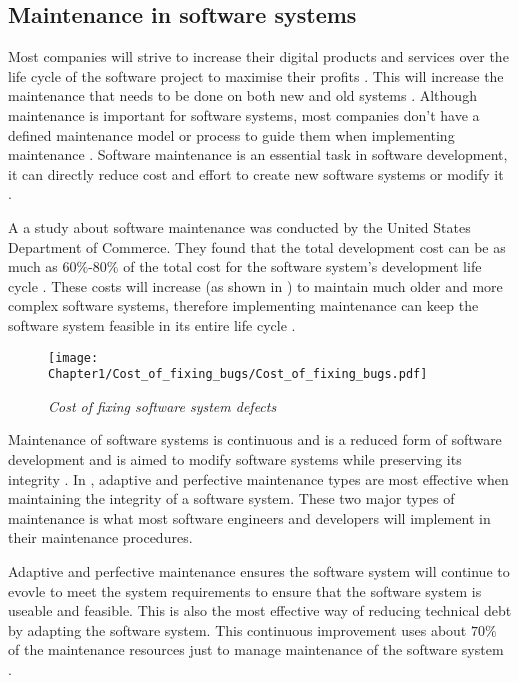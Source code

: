 \subsection{Maintenance in software systems}
Most companies will strive to increase their digital products and services over the life cycle of the software project to maximise their profits \cite{Gralha2018}. This will increase the maintenance that needs to be done on both new and old systems \cite{Niu2018, Galster2019, Hasan2012}. Although maintenance is important for software systems, most companies don't have a defined maintenance model or process to guide them when implementing maintenance \cite{Stojanov2017}. Software maintenance is an essential task in software development, it can directly reduce cost and effort to create new software systems or modify it \cite{FrancisThamburaj2017}.\par A a study about software maintenance was conducted by the United States Department of Commerce. They found that the total development cost can be as much as $60\%$-$80\%$ of the total cost for the software system's development life cycle \cite{Ogheneovo2014, Stark1996, Ackermann2009,Tang2010}. These costs will increase (as shown in ) to maintain much older and more complex software systems, therefore implementing maintenance can keep the software system feasible in its entire life cycle \cite{Alenezi2016, Booch1986}.

\begin{figure}[!htb] %
	\centering %
	\texttt{[image: Chapter1/Cost\_of\_fixing\_bugs/Cost\_of\_fixing\_bugs.pdf]}
	\caption[Cost of fixing software system defects]
	{\textit{Cost of fixing software system defects \cite{Ogheneovo2014}}}\label{fig:CH1_Costs_of_fixing_bugs}
\end{figure} 

Maintenance of software systems is continuous and is a reduced form of software development and is aimed to modify software systems while preserving its integrity \cite{Sneed2004,Ackermann2009,Port2017}. In , adaptive and perfective maintenance types are most effective when maintaining the integrity of a software system. These two major types of maintenance is what most software engineers and developers will implement in their maintenance procedures.\par Adaptive and perfective maintenance ensures the software system will continue to evovle to meet the system requirements to ensure that the software system is useable and feasible. This is also the most effective way of reducing technical debt by adapting the software system. This continuous improvement uses about $70\%$ of the maintenance resources just to manage maintenance of the software system \cite{Kumar2013}. 

